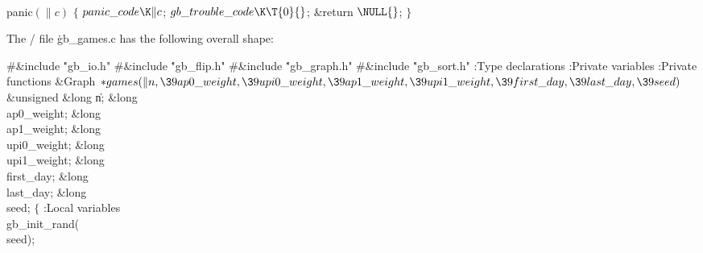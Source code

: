 \Y\B\4\D\\{panic}$(\|c)$\5
${}\{{}$\5
\1${}\\{panic\_code}\K\|c{}$;\5
${}\\{gb\_trouble\_code}\K\T{0}{}$;\5
\&{return} ${}\NULL{}$;\5
${}\}{}$\2\par
\fi

The \CEE/ file \.{gb\_games.c} has the following overall shape:

\Y\B\8\#\&{include} \.{"gb\_io.h"}\6
\8\#\&{include} \.{"gb\_flip.h"}\6
\8\#\&{include} \.{"gb\_graph.h"}\6
\8\#\&{include} \.{"gb\_sort.h"}\6
\ATH\7
:Type declarations\X\6
:Private variables\X\6
:Private functions\X\7
\1\1\&{Graph} ${}{*}\\{games}(\|n,\39\\{ap0\_weight},\39\\{upi0\_weight},\39%
\\{ap1\_weight},\39\\{upi1\_weight},\39\\{first\_day},\39\\{last\_day},\39%
\\{seed}){}$\6
\&{unsigned} \&{long} \|n;\6
\&{long} \\{ap0\_weight};\6
\&{long} \\{ap1\_weight};\6
\&{long} \\{upi0\_weight};\6
\&{long} \\{upi1\_weight};\6
\&{long} \\{first\_day};\6
\&{long} \\{last\_day};\6
\&{long} \\{seed};\2\2\6
${}\{{}$\5
\1:Local variables\X\7
\\{gb\_init\_rand}(\\{seed});\6

